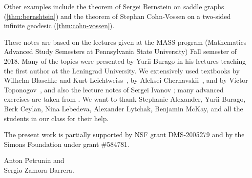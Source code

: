 Other examples include the theorem of Sergei Bernstein on saddle graphs (\ref{thm:bernshtein}) and the theorem of Stephan Cohn-Vossen
on a two-sided infinite geodesic (\ref{thm:cohn-vossen}).

These notes are based on the lectures given at the MASS program (Mathematics Advanced Study Semesters at Pennsylvania State University) Fall semester of 2018.
Many of the topics were presented by Yurii Burago in his lectures teaching the first author at the Leningrad University.
We extensively used textbooks
by Wilhelm Blaschke and Kurt Leichtweiss~\cite{blaschke-leichtweiss},
by Aleksei Chernavskii~\cite{chernavsky},
and by Victor Toponogov~\cite{toponogov-book}, and also the lecture notes of Sergei Ivanov \cite{ivanov};
many advanced exercises are taken from \cite{petrunin2020}.
We want to thank
Stephanie Alexander,
Yurii Burago, 
Berk Ceylan,
Nina Lebedeva,
Alexander Lytchak,
Benjamin McKay,
and all the students in our class
for their help.

The present work is partially supported by NSF grant DMS-2005279
and by the Simons Foundation under grant \#584781.

\begin{flushright}
Anton Petrunin and\\
Sergio Zamora Barrera.
\end{flushright}




